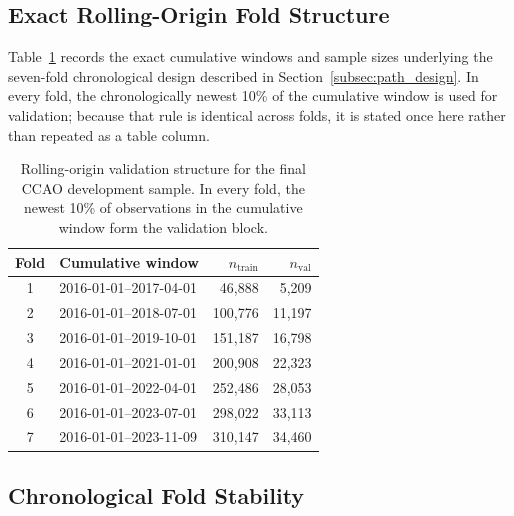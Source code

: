 \documentclass[10pt]{article}
\theoremstyle{definition}
\newcommand{\1}{\mathbf{1}}
\newcommand{\newtext}[1]{\textcolor{impGreen}{#1}}
\begin{document}
\subsection{\newtext{Exact Rolling-Origin Fold Structure}}

\newtext{Table~\ref{tab:fold_structure} records the exact cumulative windows and sample sizes underlying the seven-fold chronological design described in Section~\ref{subsec:path_design}. In every fold, the chronologically newest 10\% of the cumulative window is used for validation; because that rule is identical across folds, it is stated once here rather than repeated as a table column.}

{\color{impGreen}
\begin{table}[!ht]
\centering
\caption{Rolling-origin validation structure for the final CCAO development sample. In every fold, the newest 10\% of observations in the cumulative window form the validation block.}
\label{tab:fold_structure}
\begin{tabular}{clrr}
\toprule
Fold & Cumulative window & $n_{\mathrm{train}}$ & $n_{\mathrm{val}}$ \\
\midrule
1 & 2016-01-01--2017-04-01 & 46,888 & 5,209 \\
2 & 2016-01-01--2018-07-01 & 100,776 & 11,197 \\
3 & 2016-01-01--2019-10-01 & 151,187 & 16,798 \\
4 & 2016-01-01--2021-01-01 & 200,908 & 22,323 \\
5 & 2016-01-01--2022-04-01 & 252,486 & 28,053 \\
6 & 2016-01-01--2023-07-01 & 298,022 & 33,113 \\
7 & 2016-01-01--2023-11-09 & 310,147 & 34,460 \\
\bottomrule
\end{tabular}
\end{table}
}

\subsection{Chronological Fold Stability}
\end{document}

